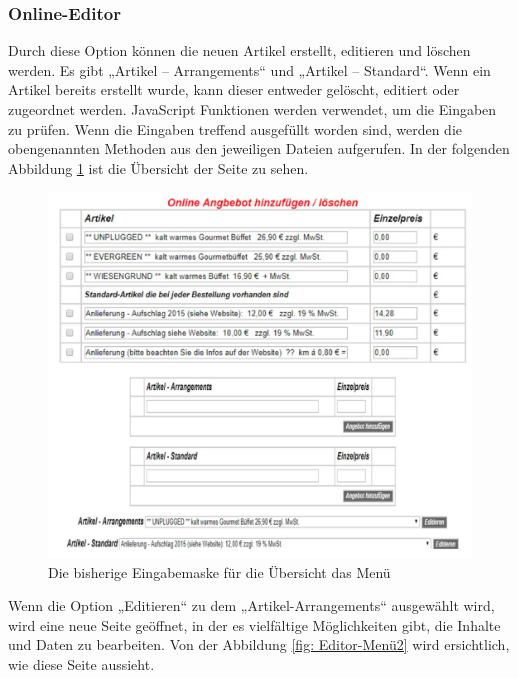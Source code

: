 \subsubsection{Online-Editor}

Durch diese Option können die neuen Artikel erstellt, editieren und löschen werden. Es gibt „Artikel – Arrangements“ und „Artikel – Standard“. Wenn ein Artikel bereits erstellt wurde, kann dieser entweder gelöscht, editiert oder zugeordnet werden. 
JavaScript Funktionen werden verwendet, um die Eingaben zu prüfen. Wenn die Eingaben treffend ausgefüllt worden sind, werden die obengenannten Methoden aus den jeweiligen Dateien aufgerufen. In der folgenden Abbildung \ref{fig: Online-EditorUebersicht} ist die Übersicht der Seite zu sehen.
\pagebreak

\begin{figure}[h]
	\centering
	\includegraphics[width=0.7\linewidth]{Graphics/menue-uebesicht.png}
	\caption[Kundeansicht]{Die bisherige Eingabemaske für die Übersicht das Menü}
	\label{fig: Online-EditorUebersicht}
\end{figure}

Wenn die Option „Editieren“ zu dem „Artikel-Arrangements“ ausgewählt wird, wird eine neue Seite geöffnet, in der es vielfältige Möglichkeiten gibt, die Inhalte und Daten zu bearbeiten. Von der Abbildung \ref{fig: Editor-Menü2} wird ersichtlich, wie diese Seite aussieht.


